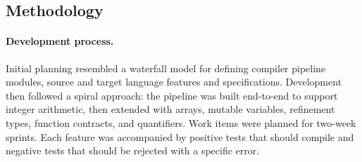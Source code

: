 \subsection{Methodology}

\paragraph{Development process.} Initial planning resembled a waterfall model for defining compiler pipeline modules, source and target language features and specifications. Development then followed a spiral approach: the pipeline was built end-to-end to support integer arithmetic, then extended with arrays, mutable variables, refinement types, function contracts, and quantifiers. Work items were planned for two-week sprints. Each feature was accompanied by positive tests that should compile and negative tests that should be rejected with a specific error.


